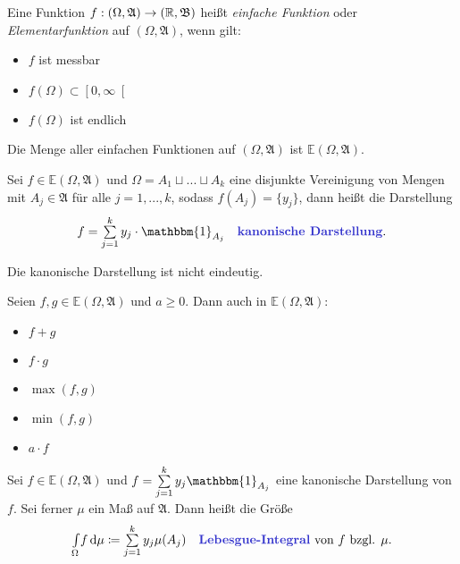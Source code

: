 \documentclass{cheat-sheet}
\newcommand{\Alg}{\mathfrak{A}} %
\newcommand{\Bor}{\mathfrak{B}} %
\newcommand{\E}{\mathbb{E}} %
\newcommand{\ind}{\mathbbm{1}} %
\newcommand{\IntOmu}[1]{\Int{\Omega}{}{#1}{\mu}} %
\begin{document}
\begin{defn}
  Eine Funktion $f : (\Omega, \Alg) \to (\R, \Bor)$ heißt \emph{einfache Funktion} oder \emph{Elementarfunktion} auf $(\Omega, \Alg)$, wenn gilt:
  \begin{multicols}{3}
    \begin{itemize}
      \item $f$ ist messbar
      \item $f(\Omega) \subset \left[0, \infty\right[$
      \item $f(\Omega)$ ist endlich
    \end{itemize}
  \end{multicols}
  Die Menge aller einfachen Funktionen auf $(\Omega, \Alg)$ ist $\E(\Omega, \Alg)$.
\end{defn}

\begin{defn}
  Sei $f \in \E(\Omega, \Alg)$ und $\Omega = A_1 \sqcup ... \sqcup A_k$ eine disjunkte Vereinigung von Mengen mit $A_j \in \Alg$ für alle $j = 1, ..., k$, sodass $f(A_j) = \{ y_j \}$, dann heißt die Darstellung
  \[ f = \sum_{j=1}^k y_j \cdot \ind_{A_j} \quad \text{\emph{kanonische Darstellung}.} \]
\end{defn}

\begin{bem}
  Die kanonische Darstellung ist nicht eindeutig.
\end{bem}

\begin{satz}
  Seien $f, g \in \E(\Omega, \Alg)$ und $a \geq 0$. Dann auch in $\E(\Omega, \Alg)$:
  \begin{multicols}{5}
    \begin{itemize}
      \item $f + g$
      \item $f \cdot g$
      \item $\max(f, g)$
      \item $\min(f, g)$
      \item $a \cdot f$
    \end{itemize}
  \end{multicols}
\end{satz}

\begin{defn}
  Sei $f \in \E(\Omega, \Alg)$ und $\textstyle f = \sum_{j=1}^k y_j \ind_{A_j}$ eine kanonische Darstellung von $f$. Sei ferner $\mu$ ein Maß auf $\Alg$. Dann heißt die Größe
  \[ \IntOmu{f} \coloneqq \sum_{j=1}^k y_j \mu(A_j) \quad \text{\emph{Lebesgue-Integral} von $f$ bzgl. $\mu$.} \]
\end{defn}
\end{document}
